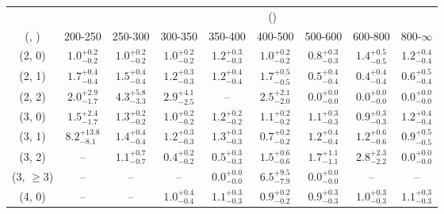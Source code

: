 \begin{table}[h!]
\tiny
\centering
{}
\begin{tabular}
{ccccccccc}
	\hline\hline
&	& \multicolumn{8}{c}{\scalht (\gev)} \\ 
	 (\njet,  \nb) & 200-250 & 250-300 & 300-350 & 350-400 & 400-500 & 500-600 & 600-800 & 800-$\infty$ \\ [0.8ex] 
\hline
	(2, 0) & $1.0^{+ 0.2 }_{- 0.2 }$ & $1.0^{+ 0.2 }_{- 0.2 }$ & $1.0^{+ 0.2 }_{- 0.2 }$ & $1.2^{+ 0.3 }_{- 0.3 }$ & $1.0^{+ 0.2 }_{- 0.2 }$ & $0.8^{+ 0.3 }_{- 0.3 }$ & $1.4^{+ 0.5 }_{- 0.5 }$ & $1.2^{+ 0.4 }_{- 0.4 }$ \\[0.5ex] 
	(2, 1) & $1.7^{+ 0.4 }_{- 0.4 }$ & $1.5^{+ 0.4 }_{- 0.4 }$ & $1.2^{+ 0.3 }_{- 0.3 }$ & $1.2^{+ 0.4 }_{- 0.4 }$ & $1.7^{+ 0.5 }_{- 0.5 }$ & $0.5^{+ 0.4 }_{- 0.4 }$ & $0.4^{+ 0.4 }_{- 0.4 }$ & $0.6^{+ 0.5 }_{- 0.4 }$ \\[0.5ex] 
	(2, 2) & $2.0^{+ 2.9 }_{- 1.7 }$ & $4.3^{+ 5.8 }_{- 3.3 }$ & $2.9^{+ 4.1 }_{- 2.5 }$ & -- & $2.5^{+ 2.1 }_{- 2.0 }$ & $0.0^{+ 0.0 }_{- 0.0 }$ & $0.0^{+ 0.0 }_{- 0.0 }$ & $0.0^{+ 0.0 }_{- 0.0 }$ \\[0.5ex] 
	(3, 0) & $1.5^{+ 2.4 }_{- 1.7 }$ & $1.3^{+ 0.2 }_{- 0.2 }$ & $1.0^{+ 0.2 }_{- 0.2 }$ & $1.2^{+ 0.2 }_{- 0.2 }$ & $1.1^{+ 0.2 }_{- 0.2 }$ & $1.1^{+ 0.3 }_{- 0.3 }$ & $0.9^{+ 0.3 }_{- 0.3 }$ & $1.2^{+ 0.4 }_{- 0.4 }$ \\[0.5ex] 
	(3, 1) & $8.2^{+ 13.8 }_{- 8.1 }$ & $1.4^{+ 0.4 }_{- 0.4 }$ & $1.2^{+ 0.3 }_{- 0.3 }$ & $1.3^{+ 0.3 }_{- 0.3 }$ & $0.7^{+ 0.2 }_{- 0.2 }$ & $1.2^{+ 0.4 }_{- 0.4 }$ & $1.2^{+ 0.6 }_{- 0.6 }$ & $0.9^{+ 0.5 }_{- 0.5 }$ \\[0.5ex] 
	(3, 2) & -- & $1.1^{+ 0.7 }_{- 0.7 }$ & $0.4^{+ 0.2 }_{- 0.2 }$ & $0.5^{+ 0.3 }_{- 0.3 }$ & $1.5^{+ 0.6 }_{- 0.6 }$ & $1.7^{+ 1.1 }_{- 1.1 }$ & $2.8^{+ 2.3 }_{- 2.2 }$ & $0.0^{+ 0.0 }_{- 0.0 }$ \\[0.5ex] 
	(3, $\ge3$) & -- & -- & -- & $0.0^{+ 0.0 }_{- 0.0 }$ & $6.5^{+ 9.5 }_{- 7.9 }$ & $0.0^{+ 0.0 }_{- 0.0 }$ & -- & -- \\[0.5ex] 
	(4, 0) & -- & -- & $1.0^{+ 0.4 }_{- 0.4 }$ & $1.1^{+ 0.3 }_{- 0.3 }$ & $0.9^{+ 0.2 }_{- 0.2 }$ & $0.9^{+ 0.3 }_{- 0.3 }$ & $1.0^{+ 0.3 }_{- 0.3 }$ & $1.1^{+ 0.3 }_{- 0.3 }$ \\[0.5ex] 

\end{tabular}
\end{table}
